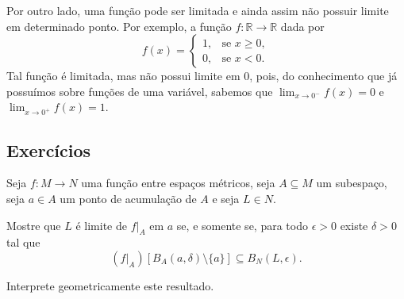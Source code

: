 Por outro lado, uma função pode ser limitada e ainda assim não possuir limite em determinado ponto.
Por exemplo, a função $f:\mathbb R\to\mathbb R$ dada por
\[
    f(x) = \begin{cases}
        1, & \text{se } x \geq 0,\\
        0, & \text{se } x < 0.
    \end{cases}
\]
Tal função é limitada, mas não possui limite em $0$, pois, do conhecimento que já possuímos sobre funções de uma variável, sabemos que $\lim_{x\to 0^-} f(x) = 0$ e $\lim_{x\to 0^+} f(x) = 1$.

\subsection*{Exercícios}
\begin{exercise}
    Seja $f:M\rightarrow N$ uma função entre espaços métricos, seja $A\subseteq M$ um subespaço, seja $a\in A$ um ponto de acumulação de $A$ e seja $L\in N$.

    Mostre que $L$ é limite de $f|_A$ em $a$ se, e somente se, para todo $\epsilon>0$ existe $\delta>0$ tal que
    \[
        (f|_A)\left[B_A(a,\delta)\setminus\{a\}\right]\subseteq B_N(L,\epsilon).
    \]
    
    Interprete geometricamente este resultado.
\end{exercise}
